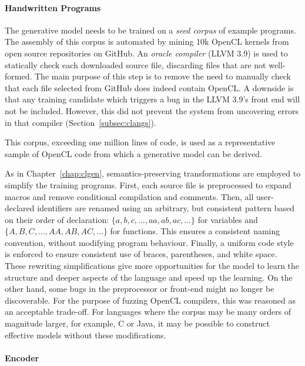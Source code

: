 \paragraph*{Handwritten Programs}

The generative model needs to be trained on a \emph{seed corpus} of example programs. The assembly of this corpus is automated by mining 10k OpenCL kernels from open source repositories on GitHub. An \emph{oracle compiler} (LLVM 3.9) is used to statically check each downloaded source file, discarding files that are not well-formed. The main purpose of this step is to remove the need to manually check that each file selected from GitHub does indeed contain OpenCL. A downside is that any training candidate which triggers a bug in the LLVM 3.9's front end will not be included. However, this did not prevent the system from uncovering errors in that compiler (Section~\ref{subsec:clangs}).

This corpus, exceeding one million lines of code, is used as a representative sample of OpenCL code from which a generative model can be derived.

As in Chapter~\ref{chap:clgen}, semantics-preserving transformations are employed to simplify the training programs. First, each source file is preprocessed to expand macros and remove conditional compilation and comments. Then, all user-declared identifiers are renamed using an arbitrary, but consistent pattern based on their order of declaration: $\{a,\allowbreak b,\allowbreak c,\allowbreak \ldots,\allowbreak aa,\allowbreak ab,\allowbreak ac,\allowbreak \ldots\}$ for variables and $\{A,\allowbreak B,\allowbreak C,\allowbreak \ldots,\allowbreak AA,\allowbreak AB,\allowbreak AC,\allowbreak \ldots\}$ for functions. This ensures a consistent naming convention, without modifying program behaviour. Finally, a uniform code style is enforced to ensure consistent use of braces, parentheses, and white space. These rewriting simplifications give more opportunities for the model to learn the structure and deeper aspects of the language and speed up the learning. On the other hand, some bugs in the preprocessor or front-end might no longer be discoverable. For the purpose of fuzzing OpenCL compilers, this was reasoned as an acceptable trade-off. For languages where the corpus may be many orders of magnitude larger, for example, C or Java, it may be possible to construct effective models without these modifications.


\paragraph*{Encoder}

